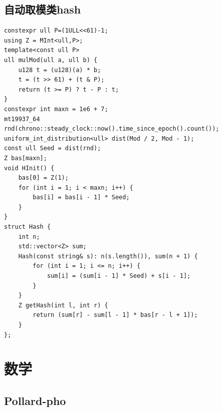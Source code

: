 \documentclass[a4paper,10pt]{article}
\begin{document}
\subsection{自动取模类hash}
\thispagestyle{fancy}

\noindent\begin{lstlisting}
constexpr ull P=(1ULL<<61)-1;
using Z = MInt<ull,P>;
template<const ull P>
ull mulMod(ull a, ull b) {
    u128 t = (u128)(a) * b;
    t = (t >> 61) + (t & P);
    return (t >= P) ? t - P : t;
}
constexpr int maxn = 1e6 + 7;
mt19937_64 rnd(chrono::steady_clock::now().time_since_epoch().count());
uniform_int_distribution<ull> dist(Mod / 2, Mod - 1);
const ull Seed = dist(rnd);
Z bas[maxn];
void HInit() {
    bas[0] = Z(1);
    for (int i = 1; i < maxn; i++) {
        bas[i] = bas[i - 1] * Seed;
    }
}
struct Hash {
    int n;
    std::vector<Z> sum;
    Hash(const string& s): n(s.length()), sum(n + 1) {
        for (int i = 1; i <= n; i++) {
            sum[i] = (sum[i - 1] * Seed) + s[i - 1];
        }
    }
    Z getHash(int l, int r) {
        return (sum[r] - sum[l - 1] * bas[r - l + 1]);
    }
};\end{lstlisting}

\section{数学}
\thispagestyle{fancy}

\subsection{Pollard-pho}
\thispagestyle{fancy}
\end{document}

